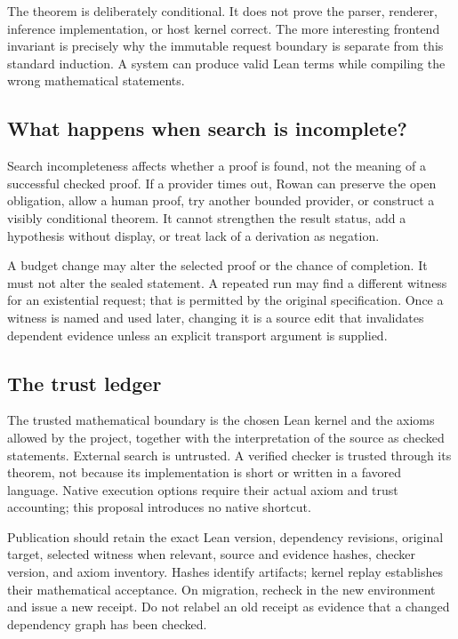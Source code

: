 \documentclass[11pt,letterpaper]{article}
\theoremstyle{definition}\newtheorem{definition}[theorem]{Definition}
\theoremstyle{remark}\newtheorem{remark}[theorem]{Remark}
\begin{document}
The theorem is deliberately conditional. It does not prove the parser,
renderer, inference implementation, or host kernel correct. The more
interesting frontend invariant is precisely why the immutable request
boundary is separate from this standard induction. A system can produce
valid Lean terms while compiling the wrong mathematical statements.

\subsection{What happens when search is incomplete?}
Search incompleteness affects whether a proof is found, not the meaning of a
successful checked proof. If a provider times out, Rowan can preserve the
open obligation, allow a human proof, try another bounded provider, or
construct a visibly conditional theorem. It cannot strengthen the result
status, add a hypothesis without display, or treat lack of a derivation as
negation.

A budget change may alter the selected proof or the chance of completion.
It must not alter the sealed statement. A repeated run may find a different
witness for an existential request; that is permitted by the original
specification. Once a witness is named and used later, changing it is a source
edit that invalidates dependent evidence unless an explicit transport
argument is supplied.

\subsection{The trust ledger}
The trusted mathematical boundary is the chosen Lean kernel and the axioms
allowed by the project, together with the interpretation of the source as
checked statements. External search is untrusted. A verified checker is
trusted through its theorem, not because its implementation is short or
written in a favored language. Native execution options require their actual
axiom and trust accounting; this proposal introduces no native shortcut.

Publication should retain the exact Lean version, dependency revisions,
original target, selected witness when relevant, source and evidence hashes,
checker version, and axiom inventory. Hashes identify artifacts; kernel replay
establishes their mathematical acceptance. On migration, recheck in the new
environment and issue a new receipt. Do not relabel an old receipt as evidence
that a changed dependency graph has been checked.
\end{document}
